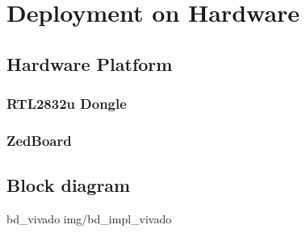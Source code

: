 \chapter{Deployment on Hardware}
\label{cha:DeploymentOnHardware}
\section{Hardware Platform}
\subsection{RTL2832u Dongle}
\subsection{ZedBoard}

\section{Block diagram}

 {bd_vivado} {img/bd_impl_vivado}
